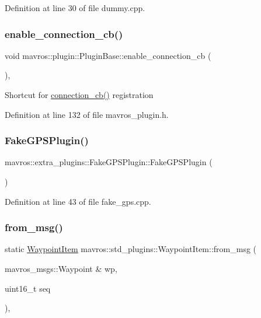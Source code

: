 Definition at line 30 of file dummy.\+cpp.

\mbox{\label{group__plugin_ga7b437229a6cd8d15a1a5c5aaff31683e}} 
\subsubsection{\texorpdfstring{enable\_connection\_cb()}{enable\_connection\_cb()}}
{\footnotesize\ttfamily void mavros\+::plugin\+::\+Plugin\+Base\+::enable\+\_\+connection\+\_\+cb (\begin{DoxyParamCaption}{ }\end{DoxyParamCaption})\hspace{0.3cm}{\ttfamily [inline]}, {\ttfamily [protected]}}

Shortcut for \mbox{\hyperlink{group__plugin_gadad2eaef432d01ad059a6edb40ab8443}{connection\+\_\+cb()}} registration 

Definition at line 132 of file mavros\+\_\+plugin.\+h.

\mbox{\label{group__plugin_ga04d1196da53b8c99546ee75790a2d1ef}} 
\subsubsection{\texorpdfstring{FakeGPSPlugin()}{FakeGPSPlugin()}}
{\footnotesize\ttfamily mavros\+::extra\+\_\+plugins\+::\+Fake\+G\+P\+S\+Plugin\+::\+Fake\+G\+P\+S\+Plugin (\begin{DoxyParamCaption}{ }\end{DoxyParamCaption})\hspace{0.3cm}{\ttfamily [inline]}}



Definition at line 43 of file fake\+\_\+gps.\+cpp.

\mbox{\label{group__plugin_gac1275a7e8aa3ffb259d1009078a56d44}} 
\subsubsection{\texorpdfstring{from\_msg()}{from\_msg()}}
{\footnotesize\ttfamily static \mbox{\hyperlink{classmavros_1_1std__plugins_1_1WaypointItem}{Waypoint\+Item}} mavros\+::std\+\_\+plugins\+::\+Waypoint\+Item\+::from\+\_\+msg (\begin{DoxyParamCaption}\item[{mavros\+\_\+msgs\+::\+Waypoint \&}]{wp,  }\item[{uint16\+\_\+t}]{seq }\end{DoxyParamCaption})\hspace{0.3cm}{\ttfamily [inline]}, {\ttfamily [static]}}



